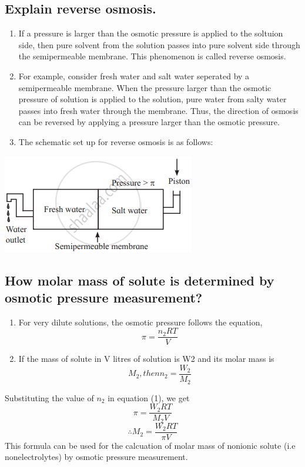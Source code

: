 \documentclass{article}
\begin{document}
   \subsection{Explain reverse osmosis.}
   \begin{enumerate}
	\item If a pressure is larger than the osmotic pressure is
	applied to the soltuion side, then pure solvent from the
	solution passes into pure solvent side through the
	semipermeable membrane. This phenomenon is called reverse
	osmosis.
	\item For example, consider fresh water and salt water 
	seperated by a semipermeable membrane. When the pressure
	larger than the osmotic pressure of solution is applied to
	the solution, pure water from salty water passes into fresh
	water through the membrane. Thus, the direction of osmosis
	can be reversed by applying a pressure larger than the osmotic
	pressure.
	\item The schematic set up for reverse osmosis is as follows:
   \end{enumerate}
   \includegraphics[scale=0.5]{reverse}

   \subsection{How molar mass of solute is determined by osmotic
   pressure measurement?}
   \begin{enumerate}
	\item For very dilute solutions, the osmotic pressure follows
	the equation, 
	\begin{equation} \pi = \frac{n_2RT}{V} \end{equation}
	\item If the mass of solute in V litres of solution is W2 and
	its molar mass is 
	\begin{equation} M_2, then n_2 = \frac{W_2}{M_2} \end{equation}
   \end{enumerate}
   Substituting the value of $n_2$ in equation (1), we get
   \begin{equation} \pi = \frac{W_2RT}{M_2V} \end{equation}
   \begin{equation} \therefore M_2 = \frac{W_2RT}{\pi V} \end{equation}
   This formula can be used for the calcuation of molar mass of
   nonionic solute (i.e nonelectrolytes) by osmotic pressure 
   measurement.
\end{document}
